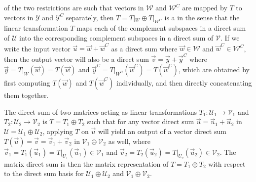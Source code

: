 of the two restrictions are such that vectors in $\mathcal{W}$ and $\mathcal{W}^C$ are mapped by $T$ to vectors in $\mathcal{Y}$ and $\mathcal{Y}^C$ separately, then $T = T|_W \oplus T|_{W^C}$ is a  in the sense that the linear transformation $T$ maps each of the complement subspaces in a direct sum of $\mathcal{U}$ into the corresponding complement subspaces in a direct sum of $\mathcal{V}$. If we write the input vector $\vec{u} = \vec{w} + \vec{w}^C$ as a direct sum where $\vec{w} \in \mathcal{W}$ and $\vec{w}^C \in \mathcal{W}^C$, then the output vector will also be a direct sum $\vec{v} = \vec{y} + \vec{y}^C$ where $\vec{y} = T|_W(\vec{w}) = T(\vec{w})$ and $\vec{y}^C = T|_{W^C}(\vec{w}^C) = T(\vec{w}^C)$, which are obtained by first computing $T(\vec{w})$ and $T(\vec{w}^C)$ individually, and then directly concatenating them together.
\begin{defn}
\label{defn:matdirectsum}
The direct sum of two matrices acting as linear transformations $T_1: \mathcal{U}_1 \to \mathcal{V}_1$ and $T_2: \mathcal{U}_2 \to \mathcal{V}_2$ is $T = T_1 \oplus T_2$ such that for any vector direct sum $\vec{u} = \vec{u}_1 + \vec{u}_2$ in $\mathcal{U} = \mathcal{U}_1 \oplus \mathcal{U}_2$, applying $T$ on $\vec{u}$ will yield an output of a vector direct sum $T(\vec{u}) = \vec{v} = \vec{v}_1 + \vec{v}_2$ in $\mathcal{V}_1 \oplus \mathcal{V}_2$ as well, where $\vec{v}_1 = T_1(\vec{u}_1) = T|_{U_1}(\vec{u}_1) \in \mathcal{V}_1$ and $\vec{v}_2 = T_2(\vec{u}_2) = T|_{U_2}(\vec{u}_2) \in \mathcal{V}_2$. The matrix direct sum is then the matrix representation of $T = T_1 \oplus T_2$ with respect to the direct sum basis for $\mathcal{U}_1 \oplus \mathcal{U}_2$ and $\mathcal{V}_1 \oplus \mathcal{V}_2$.
\end{defn}
